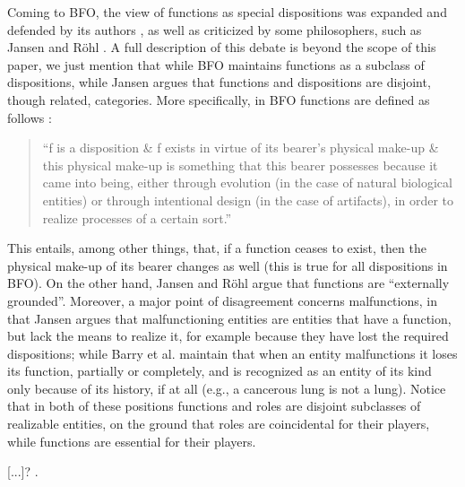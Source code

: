 \documentclass[sw]{iosart2x}
\newcommand{\BFO}{\textsc{BFO}\xspace}
\newcommand{\qquotes}[1]{``#1''}
\newcommand{\TODO}[1]{{\color{red} #1
}}
\begin{document}
Coming to \BFO, the view of functions as special dispositions was expanded and defended by its authors \cite{arpFunctionRoleDisposition2008,spearFunctionsBasicFormal2016}, as well as criticized by some philosophers, such as Jansen and Röhl \cite{rohlWhyFunctionsAre2014,jansenFunctionsMalfunctioningNegative2018}. 
A full description of this debate is beyond the scope of this paper, we just mention that while \BFO maintains functions as a subclass of dispositions, while Jansen argues that functions and dispositions are disjoint, though related, categories. 
More specifically, in \BFO functions are defined as follows \cite{spearFunctionsBasicFormal2016}:
\begin{quote}
  \qquotes{f is a disposition \& f exists in virtue of its bearer’s physical make-up \& this physical make-up is something that this bearer possesses because it came into being, either through evolution (in the case of natural biological entities) or through intentional design (in the case of artifacts), in order to realize processes of a certain sort.}
\end{quote} 
This entails, among other things, that, if a function ceases to exist, then the physical make-up of its bearer changes as well (this is true for all dispositions in \BFO).
On the other hand, Jansen and Röhl argue that functions are \qquotes{externally grounded}.
Moreover, a major point of disagreement concerns malfunctions, in that Jansen argues that malfunctioning entities are entities that have a function, but lack the means to realize it, for example because they have lost the required dispositions; while Barry et al. maintain that when an entity malfunctions it loses its function, partially or completely, and is recognized as an entity of its kind only because of its history, if at all (e.g., a cancerous lung is not a lung).
Notice that in both of these positions functions and roles are disjoint subclasses of realizable entities, on the ground that roles are coincidental for their players, while functions are essential for their players.

\TODO{[...]?}.
\end{document}
